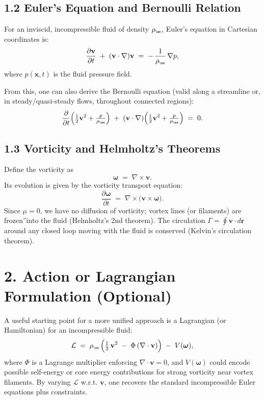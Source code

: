 \subsection*{1.2 Euler's Equation and Bernoulli Relation}
For an inviscid, incompressible fluid of density \(\rho_{\scriptscriptstyle \mathrm{\ae}}\), Euler's equation in Cartesian coordinates is:
\[
 \frac{\partial \mathbf{v}}{\partial t} \;+\; (\mathbf{v}\cdot\nabla)\mathbf{v} \;=\; -\,\frac{1}{\rho_{\scriptscriptstyle \mathrm{\ae}}}\,\nabla p,
\]
where \(p(\mathbf{x},t)\) is the fluid pressure field.

From this, one can also derive the Bernoulli equation (valid along a streamline or, in steady/quasi-steady flows, throughout connected regions):
\[
 \frac{\partial}{\partial t} \Bigl( \tfrac12 \mathbf{v}^2 + \tfrac{p}{\rho_{\scriptscriptstyle \mathrm{\ae}}} \Bigr) \;+\; (\mathbf{v}\cdot\nabla) \Bigl( \tfrac12 \mathbf{v}^2 + \tfrac{p}{\rho_{\scriptscriptstyle \mathrm{\ae}}} \Bigr) \;=\; 0.
\]

\subsection*{1.3 Vorticity and Helmholtz's Theorems}
Define the vorticity as
\[
 \boldsymbol{\omega} \;=\; \nabla \times \mathbf{v}.
\]
Its evolution is given by the vorticity transport equation:
\[
 \frac{\partial \boldsymbol{\omega}}{\partial t} \;=\; \nabla\times\bigl(\mathbf{v}\times\boldsymbol{\omega}\bigr).
\]
Since \(\mu=0\), we have no diffusion of vorticity; vortex lines (or filaments) are \grqq frozen\textquotedblright into the fluid (Helmholtz's 2nd theorem). The circulation \(\Gamma = \oint \mathbf{v}\cdot d\mathbf{r}\) around any closed loop moving with the fluid is conserved (Kelvin's circulation theorem).

\section*{2. Action or Lagrangian Formulation (Optional)}
A useful starting point for a more unified approach is a Lagrangian (or Hamiltonian) for an incompressible fluid:
\[
 \mathcal{L} \;=\; \rho_{\scriptscriptstyle \mathrm{\ae}}\, \Bigl( \tfrac12\,\mathbf{v}^2 \;-\; \Phi\,(\nabla\cdot\mathbf{v}) \Bigr) \;-\; V(\boldsymbol{\omega}),
\]
where \(\Phi\) is a Lagrange multiplier enforcing \(\nabla\cdot \mathbf{v}=0\), and \(V(\boldsymbol{\omega})\) could encode possible self-energy or core energy contributions for strong vorticity near vortex filaments. By varying \(\mathcal{L}\) w.r.t. \(\mathbf{v}\), one recovers the standard incompressible Euler equations plus constraints.

